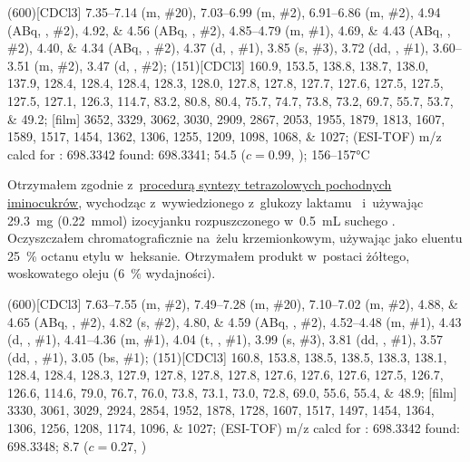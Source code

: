 \begin{fullexp}
	\NMR(600)[CDCl3] \numrange{7.35}{7.14} (m, \#{20}), \numrange{7.03}{6.99} (m, \#{2}), \numrange{6.91}{6.86} (m, \#{2}), \num{4.94} (ABq, , \#{2}), \numlist{4.92;4.56} (ABq, , \#{2}), \numrange{4.85}{4.79} (m, \#{1}), \numlist{4.69;4.43} (ABq, , \#{2}), \numlist{4.40;4.34} (ABq, , \#{2}), \num{4.37} (d, , \#{1}), \num{3.85} (s, \#{3}), \num{3.72} (dd, , \#{1}), \numrange{3.60}{3.51} (m, \#{2}), \num{3.47} (d, , \#{2});
	(151)[CDCl3] \numlist{160.9; 153.5; 138.8; 138.7; 138.0; 137.9; 128.4; 128.4; 128.4; 128.3; 128.0; 127.8; 127.8; 127.7; 127.6; 127.5; 127.5; 127.5; 127.1; 126.3; 114.7; 83.2; 80.8; 80.4; 75.7; 74.7; 73.8; 73.2; 69.7; 55.7; 53.7; 49.2};
	[film] \numlist{3652; 3329; 3062; 3030; 2909; 2867; 2053; 1955; 1879; 1813; 1607; 1589; 1517; 1454; 1362; 1306; 1255; 1209; 1098; 1068; 1027};
	 (ESI-TOF) m/z calcd for : \num{698.3342} found: \num{698.3341};
	\data{[$\alpha^{23}_D$]~$=$} \num{54.5} ($c = 0.99$, );
	 \numrange{156}{157}\si{\celsius}
\end{fullexp}

Otrzymałem zgodnie z~\hyperref[experimental:sugars:schwartz]{procedurą syntezy tetrazolowych
	pochodnych iminocukrów}, wychodząc z~wywiedzionego z~glukozy laktamu~
	i~używając \SI{29.3}{\milli\gram} (\SI{0.22}{\milli\mol}) izocyjanku 
	rozpuszczonego w~\SI{0.5}{\milli\liter} suchego .
Oczyszczałem chromatograficznie na~żelu krzemionkowym,
	używając jako eluentu \SI{25}{\percent} octanu etylu w~heksanie.
Otrzymałem produkt w~postaci żółtego, woskowatego oleju (\SI{6}{\percent} wydajności).

\begin{fullexp}
	\NMR(600)[CDCl3] \numrange{7.63}{7.55} (m, \#{2}), \numrange{7.49}{7.28} (m, \#{20}), \numrange{7.10}{7.02} (m, \#{2}), \numlist{4.88;4.65} (ABq, , \#{2}), \num{4.82} (s, \#{2}), \numlist{4.80;4.59} (ABq, , \#{2}), \numrange{4.52}{4.48} (m, \#{1}), \num{4.43} (d, , \#{1}), \numrange{4.41}{4.36} (m, \#{1}), \num{4.04} (t, , \#{1}), \num{3.99} (s, \#{3}), \num{3.81} (dd, , \#{1}), \num{3.57} (dd, , \#{1}), \num{3.05} (bs, \#{1});
	(151)[CDCl3] \numlist{160.8; 153.8; 138.5; 138.5; 138.3; 138.1; 128.4; 128.4; 128.3; 127.9; 127.8; 127.8; 127.8; 127.6; 127.6; 127.6; 127.5; 126.7; 126.6; 114.6; 79.0; 76.7; 76.0; 73.8; 73.1; 73.0; 72.8; 69.0; 55.6; 55.4; 48.9};
	[film] \numlist{3330; 3061; 3029; 2924; 2854; 1952; 1878; 1728; 1607; 1517; 1497; 1454; 1364; 1306; 1256; 1208; 1174; 1096; 1027};
	 (ESI-TOF) m/z calcd for : \num{698.3342} found: \num{698.3348};
	\data{[$\alpha^{23}_D$]~$=$} \num{8.7} ($c = 0.27$, )
\end{fullexp}

